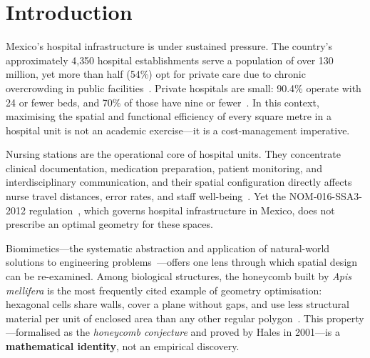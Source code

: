 \documentclass[12pt,a4paper]{article}
\begin{document}
\begin{abstract}
\noindent\textbf{Conclusions.}
The theoretical 6.94\% material savings reverses at the floor-plan level after
wall-sharing accounting.
The primary quantitative case for hexagonal nursing stations is a 20.1\% reduction in
mean nurse travel distance, confirmed by exact graph-model TSP optimisation, without
a meaningful impact on the optimal full-round tour ($<$2\% difference).
Future work should validate travel-distance findings with discrete-event simulation
in a real Mexican hospital unit and verify NOM-016-SSA3-2012 compliance.

\medskip
\noindent\textbf{Keywords:} biomimetics; hospital design; hexagonal geometry;
nursing station; honeycomb conjecture; Mexico; partition efficiency; biophilic design
\end{abstract}

\section{Introduction}

Mexico's hospital infrastructure is under sustained pressure.
The country's approximately 4{,}350 hospital establishments serve a population
of over 130 million, yet more than half (54\%) opt for private care due to
chronic overcrowding in public facilities~\cite{garrido2025saturation,secretariasalud2022}.
Private hospitals are small: 90.4\% operate with 24 or fewer beds, and 70\% of
those have nine or fewer~\cite{inegi2024health}.
In this context, maximising the spatial and functional efficiency of every square
metre in a hospital unit is not an academic exercise---it is a cost-management
imperative.

Nursing stations are the operational core of hospital units.
They concentrate clinical documentation, medication preparation, patient monitoring,
and interdisciplinary communication, and their spatial configuration directly
affects nurse travel distances, error rates, and staff well-being~\cite{friesen2008nursing,ulrich2008evidence}.
Yet the NOM-016-SSA3-2012 regulation~\cite{nom016ssa2012}, which governs hospital
infrastructure in Mexico, does not prescribe an optimal geometry for these spaces.

Biomimetics---the systematic abstraction and application of natural-world solutions
to engineering problems~\cite{pohl2015biomimetics,niebaum2017biomimetics}---offers
one lens through which spatial design can be re-examined.
Among biological structures, the honeycomb built by \textit{Apis mellifera} is
the most frequently cited example of geometry optimisation: hexagonal cells share
walls, cover a plane without gaps, and use less structural material per unit of
enclosed area than any other regular polygon~\cite{hales2001honeycomb,zhang2013honeycomb}.
This property---formalised as the \emph{honeycomb conjecture} and proved by Hales
in 2001---is a \textbf{mathematical identity}, not an empirical discovery.
\end{document}
